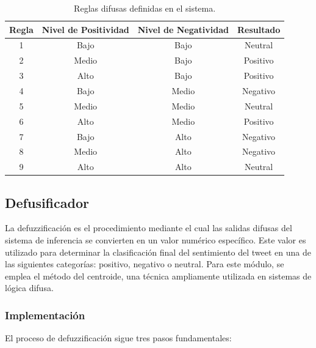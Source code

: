 \documentclass[sigconf, review=false, nonacm]{acmart}
\begin{document}
\begin{table}[h!]
	\centering
	\begin{tabular}{|c|c|c|c|}
		\hline
		\textbf{Regla} & \textbf{Nivel de Positividad} & \textbf{Nivel de Negatividad} & \textbf{Resultado} \\ \hline
		1              & Bajo                          & Bajo                          & Neutral            \\ \hline
		2              & Medio                         & Bajo                          & Positivo           \\ \hline
		3              & Alto                          & Bajo                          & Positivo           \\ \hline
		4              & Bajo                          & Medio                         & Negativo           \\ \hline
		5              & Medio                         & Medio                         & Neutral            \\ \hline
		6              & Alto                          & Medio                         & Positivo           \\ \hline
		7              & Bajo                          & Alto                          & Negativo           \\ \hline
		8              & Medio                         & Alto                          & Negativo           \\ \hline
		9              & Alto                          & Alto                          & Neutral            \\ \hline
	\end{tabular}
	\caption{Reglas difusas definidas en el sistema.}
	\label{table:reglas_difusas}
\end{table}

\subsection{Defusificador}
La defuzzificación es el procedimiento mediante el cual las salidas difusas del sistema de inferencia se
convierten en un valor numérico específico. Este valor es utilizado para determinar la clasificación final del
sentimiento del tweet en una de las siguientes categorías: positivo, negativo o neutral. Para este módulo, se
emplea el método del centroide, una técnica ampliamente utilizada en sistemas de lógica difusa.

\subsubsection{Implementación}
El proceso de defuzzificación sigue tres pasos fundamentales:
\end{document}

